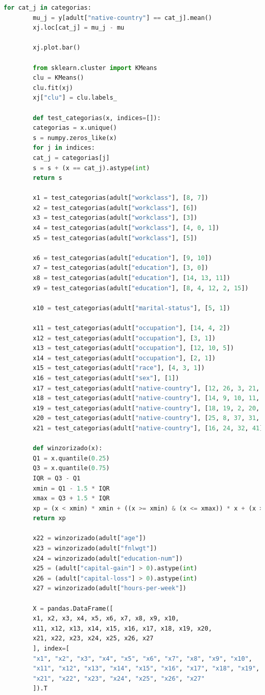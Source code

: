 \documentclass{article}
\begin{document}
\begin{lstlisting}[language=Python]
		for cat_j in categorias:
		mu_j = y[adult["native-country"] == cat_j].mean()
		xj.loc[cat_j] = mu_j - mu
		
		xj.plot.bar()
		
		from sklearn.cluster import KMeans
		clu = KMeans()
		clu.fit(xj)
		xj["clu"] = clu.labels_
		
		def test_categorias(x, indices=[]):
		categorias = x.unique()
		s = numpy.zeros_like(x)
		for j in indices:
		cat_j = categorias[j]
		s = s + (x == cat_j).astype(int)
		return s
		
		x1 = test_categorias(adult["workclass"], [8, 7])
		x2 = test_categorias(adult["workclass"], [6])
		x3 = test_categorias(adult["workclass"], [3])
		x4 = test_categorias(adult["workclass"], [4, 0, 1])
		x5 = test_categorias(adult["workclass"], [5])
		
		x6 = test_categorias(adult["education"], [9, 10])
		x7 = test_categorias(adult["education"], [3, 0])
		x8 = test_categorias(adult["education"], [14, 13, 11])
		x9 = test_categorias(adult["education"], [8, 4, 12, 2, 15])
		
		x10 = test_categorias(adult["marital-status"], [5, 1])
		
		x11 = test_categorias(adult["occupation"], [14, 4, 2])
		x12 = test_categorias(adult["occupation"], [3, 1])
		x13 = test_categorias(adult["occupation"], [12, 10, 5])
		x14 = test_categorias(adult["occupation"], [2, 1])
		x15 = test_categorias(adult["race"], [4, 3, 1])
		x16 = test_categorias(adult["sex"], [1])
		x17 = test_categorias(adult["native-country"], [12, 26, 3, 21, 29, 30, 17])
		x18 = test_categorias(adult["native-country"], [14, 9, 10, 11, 13, 38])
		x19 = test_categorias(adult["native-country"], [18, 19, 2, 20, 23, 34, 7, 22])
		x20 = test_categorias(adult["native-country"], [25, 8, 37, 31, 36, 5, 27])
		x21 = test_categorias(adult["native-country"], [16, 24, 32, 41])
		
		def winzorizado(x):
		Q1 = x.quantile(0.25)
		Q3 = x.quantile(0.75)
		IQR = Q3 - Q1
		xmin = Q1 - 1.5 * IQR
		xmax = Q3 + 1.5 * IQR
		xp = (x < xmin) * xmin + ((x >= xmin) & (x <= xmax)) * x + (x > xmax) * xmax
		return xp
		
		x22 = winzorizado(adult["age"])
		x23 = winzorizado(adult["fnlwgt"])
		x24 = winzorizado(adult["education-num"])
		x25 = (adult["capital-gain"] > 0).astype(int)
		x26 = (adult["capital-loss"] > 0).astype(int)
		x27 = winzorizado(adult["hours-per-week"])
		
		X = pandas.DataFrame([
		x1, x2, x3, x4, x5, x6, x7, x8, x9, x10,
		x11, x12, x13, x14, x15, x16, x17, x18, x19, x20,
		x21, x22, x23, x24, x25, x26, x27
		], index=[
		"x1", "x2", "x3", "x4", "x5", "x6", "x7", "x8", "x9", "x10",
		"x11", "x12", "x13", "x14", "x15", "x16", "x17", "x18", "x19", "x20",
		"x21", "x22", "x23", "x24", "x25", "x26", "x27"
		]).T
		

\end{lstlisting}
\end{document}
